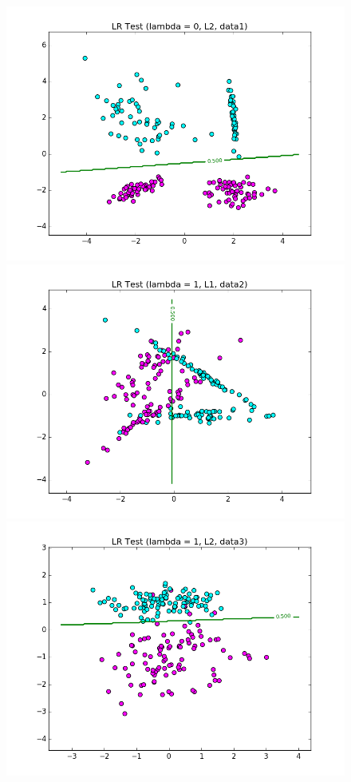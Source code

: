 \documentclass{article}
\begin{document}
\begin{figure}[width=\linewidth]
\centering
\begin{multicols}{2}
  \includegraphics[width=1.2\linewidth]{Part1_data1_test.png}
  \includegraphics[width=1.2\linewidth]{Part1_data2_test.png}
  \includegraphics[width=1.2\linewidth]{Part1_data3_test.png}

\end{multicols}
\end{figure}
\end{document}
